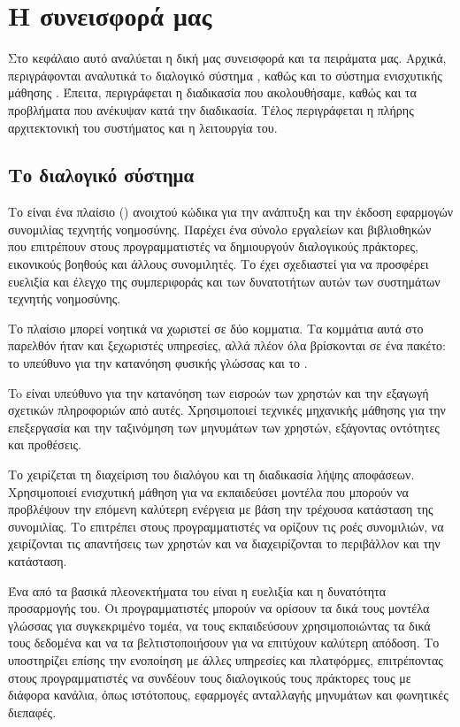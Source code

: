 \chapter{Η συνεισφορά μας}
\label{chap:ourwork}

Στο κεφάλαιο αυτό αναλύεται η δική μας συνεισφορά και τα πειράματα μας. Αρχικά, περιγράφονται αναλυτικά τo διαλογικό σύστημα , καθώς και το σύστημα ενισχυτικής μάθησης . Έπειτα, περιγράφεται η διαδικασία που ακολουθήσαμε, καθώς και τα προβλήματα που ανέκυψαν κατά την διαδικασία. Τέλος περιγράφεται η πλήρης αρχιτεκτονική του συστήματος και η λειτουργία του.

\section{Το διαλογικό σύστημα }

Το  είναι ένα πλαίσιο () ανοιχτού κώδικα για την ανάπτυξη και την έκδοση εφαρμογών συνομιλίας τεχνητής νοημοσύνης. Παρέχει ένα σύνολο εργαλείων και βιβλιοθηκών που επιτρέπουν στους προγραμματιστές να δημιουργούν διαλογικούς πράκτορες, εικονικούς βοηθούς και άλλους συνομιλητές. Το  έχει σχεδιαστεί για να προσφέρει ευελιξία και έλεγχο της συμπεριφοράς και των δυνατοτήτων αυτών των συστημάτων τεχνητής νοημοσύνης.

Το πλαίσιο  μπορεί νοητικά να χωριστεί σε δύο κομματια. Τα κομμάτια αυτά στο παρελθόν ήταν και ξεχωριστές υπηρεσίες, αλλά πλέον όλα βρίσκονται σε ένα πακέτο: το  υπεύθυνο για την κατανόηση φυσικής γλώσσας και το .

To  είναι υπεύθυνο για την κατανόηση των εισροών των χρηστών και την εξαγωγή σχετικών πληροφοριών από αυτές. Χρησιμοποιεί τεχνικές μηχανικής μάθησης για την επεξεργασία και την ταξινόμηση των μηνυμάτων των χρηστών, εξάγοντας οντότητες και προθέσεις.

Το  χειρίζεται τη διαχείριση του διαλόγου και τη διαδικασία λήψης αποφάσεων. Χρησιμοποιεί ενισχυτική μάθηση για να εκπαιδεύσει μοντέλα που μπορούν να προβλέψουν την επόμενη καλύτερη ενέργεια με βάση την τρέχουσα κατάσταση της συνομιλίας. Το  επιτρέπει στους προγραμματιστές να ορίζουν τις ροές συνομιλιών, να χειρίζονται τις απαντήσεις των χρηστών και να διαχειρίζονται το περιβάλλον και την κατάσταση.

Ένα από τα βασικά πλεονεκτήματα του  είναι η ευελιξία και η δυνατότητα προσαρμογής του. Οι προγραμματιστές μπορούν να ορίσουν τα δικά τους μοντέλα γλώσσας για συγκεκριμένο τομέα, να τους εκπαιδεύσουν χρησιμοποιώντας τα δικά τους δεδομένα και να τα βελτιστοποιήσουν για να επιτύχουν καλύτερη απόδοση. Το  υποστηρίζει επίσης την ενοποίηση με άλλες υπηρεσίες και πλατφόρμες, επιτρέποντας στους προγραμματιστές να συνδέουν τους διαλογικούς τους πράκτορες τους με διάφορα κανάλια, όπως ιστότοπους, εφαρμογές ανταλλαγής μηνυμάτων και φωνητικές διεπαφές.

